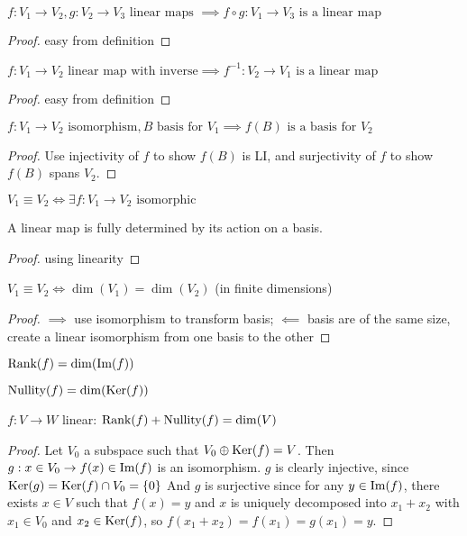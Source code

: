\begin{property}
	$f:V_1 \to V_2, g:V_2 \to V_3 \text{ linear maps } \implies f \circ g:V_1 \to V_3 \text{ is a linear map}$
\end{property}
\begin{proof}
	easy from definition
\end{proof}
\begin{property}
	$f:V_1 \to V_2 \text{ linear map with inverse} \implies f^{-1}:V_2 \to V_1 \text{ is a linear map}$
\end{property}
\begin{proof}
	easy from definition
\end{proof}

\begin{property}
	$f:V_1 \to V_2 \text{ isomorphism}, B \text{ basis for } V_1 \implies f(B) \text{ is a basis for } V_2$ 
\end{property}
\begin{proof}
	Use injectivity of $f$ to show $f(B)$ is LI, and surjectivity of $f$ to show $f(B)$ spans $V_2$.
\end{proof}
\begin{notation}
	$V_1 \equiv V_2 \iff \exists f:V_1 \to V_2 \text{ isomorphic}$
\end{notation}
\begin{property}
	A linear map is fully determined by its action on a basis.
\end{property}
\begin{proof}
	using linearity
\end{proof}
\begin{property}
	$V_1 \equiv V_2 \iff \dim(V_1)=\dim(V_2)$ (in finite dimensions)
\end{property}
\begin{proof}
	$\implies$ use isomorphism to transform basis; $\impliedby$ basis are of the same size, create a linear isomorphism from one basis to the other
\end{proof}

\begin{definition}
	$\text{Rank}(f)=\dim(\text{Im}(f))$
\end{definition}
\begin{definition}
	$\text{Nullity}(f)=\dim(\text{Ker}(f))$
\end{definition}
\begin{theorem}
	$f:V \to W$ linear: $\text{Rank}(f)+\text{Nullity}(f)=\dim(V)$
\end{theorem}
\begin{proof}
	Let $V_0$ a subspace such that $V_0 \oplus \text{Ker}(f) = V$.
	Then $g:x \in V_0 \to f(x) \in \text{Im}(f)$ is an isomorphism.
	$g$ is clearly injective, since $\text{Ker}(g)=\text{Ker}(f) \cap V_0 = \{0\}$
	And $g$ is surjective since for any $y \in \text{Im}(f)$, there exists $x \in V$ such that $f(x)=y$ and $x$ is uniquely decomposed into $x_1 + x_2$ with $x_1 \in V_0$ and $x_2 \in \text{Ker}(f)$, so $f(x_1+x_2)=f(x_1)=g(x_1)=y$.
\end{proof}


